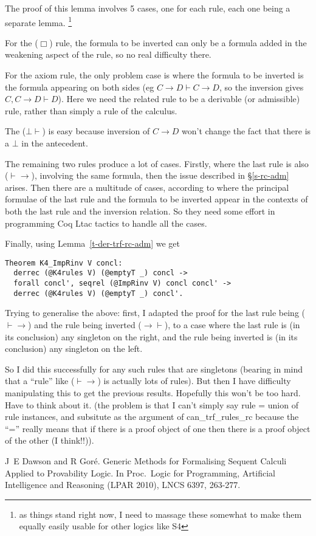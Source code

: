 \documentclass[a4paper,12pt]{llncs}
\begin{document}
The proof of this lemma involves 5 cases, one for each rule,
each one being a separate lemma.
\footnote{as things stand right now, I need to massage these somewhat
to make them equally easily usable for other logics like S4}

For the ($\Box$) rule, the formula to be inverted can only be a formula added
in the weakening aspect of the rule, so no real difficulty there.

For the axiom rule, the only problem case is where the formula to be inverted
is the formula appearing on both sides (eg $C \to D \vdash C \to D$,
so the inversion gives $C, C \to D \vdash D$).
Here we need the related rule to be a derivable (or admissible) rule, 
rather than simply a rule of the calculus.

The ($\bot\vdash$) is easy because inversion of $C \to D$ won't change the fact 
that there is a $\bot$ in the antecedent.

The remaining two rules produce a lot of cases.
Firstly, where the last rule is also ($\vdash\to$), involving the same formula,
then the issue described in \S\ref{s-rc-adm} arises. 
Then there are a multitude of cases, according to where the principal
formulae of the last rule and the formula to be inverted appear in the contexts
of both the last rule and the inversion relation. 
So they need some effort in programming Coq Ltac tactics to handle all the
cases.

Finally, using Lemma~\ref{t-der-trf-rc-adm} we get
\begin{theorem}\label{t-K4-ImpRinv}
\end{theorem}
\begin{verbatim}
Theorem K4_ImpRinv V concl:
  derrec (@K4rules V) (@emptyT _) concl ->
  forall concl', seqrel (@ImpRinv V) concl concl' ->
  derrec (@K4rules V) (@emptyT _) concl'.
\end{verbatim}

Trying to generalise the above: first, I adapted the proof for
the last rule being ($\vdash\to$) and the rule being inverted
($\to\vdash$), to a case where the last rule is (in its conclusion) any
singleton on the right, and the rule being inverted is (in its conclusion) any
singleton on the left.

So I did this successfully for any such rules that are singletons (bearing in
mind that a ``rule'' like ($\vdash\to$) is actually lots of rules).
But then I have difficulty manipulating this to get the previous results.
Hopefully this won't be too hard.
Have to think about it. (the problem is that I can't simply say
rule = union of rule instances, and subsitute as the argument of
can\_trf\_rules\_rc because the ``='' really means that if there is a proof object
of one then there is a proof object of the other (I think!!)).

\begin{thebibliography}{10}

J~E Dawson and R Gor{\'e}.
\newblock Generic Methods for Formalising Sequent Calculi
       Applied to Provability Logic.
\newblock In Proc.\ Logic for Programming, Artificial Intelligence and
Reasoning (LPAR 2010), LNCS 6397, 263-277.

\end{thebibliography}
\end{document}
